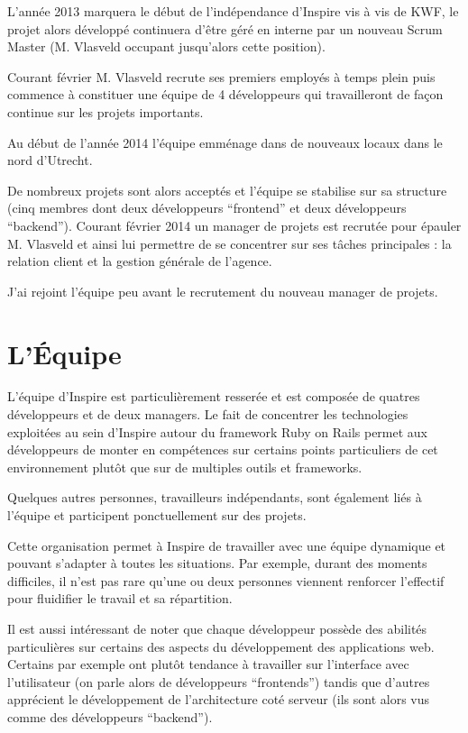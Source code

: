 \documentclass[12pt,a4paper]{book}
\begin{document}
L'année 2013 marquera le début de l'indépendance d'Inspire vis à vis de KWF, le projet alors développé continuera d'être géré en interne par un nouveau Scrum Master (M. Vlasveld occupant jusqu'alors cette position).

Courant février M. Vlasveld recrute ses premiers employés à temps plein puis commence à constituer une équipe de 4 développeurs qui travailleront de façon continue sur les projets importants.

Au début de l'année 2014 l'équipe emménage dans de nouveaux locaux dans le nord d'Utrecht.

De nombreux projets sont alors acceptés et l'équipe se stabilise sur sa structure (cinq membres dont deux développeurs ``frontend'' et deux développeurs ``backend''). Courant février 2014 un manager de projets est recrutée pour épauler M. Vlasveld et ainsi lui permettre de se concentrer sur ses tâches principales : la relation client et la gestion générale de l'agence.

J'ai rejoint l'équipe peu avant le recrutement du nouveau manager de projets.

\section{L'Équipe}

L'équipe d'Inspire est particulièrement resserée et est composée de quatres développeurs et de deux managers. Le fait de concentrer les technologies exploitées au sein d'Inspire autour du framework Ruby on Rails permet aux développeurs de monter en compétences sur certains points particuliers de cet environnement plutôt que sur de multiples outils et frameworks.

Quelques autres personnes, travailleurs indépendants, sont également liés à l'équipe et participent ponctuellement sur des projets.

Cette organisation permet à Inspire de travailler avec une équipe dynamique et pouvant s'adapter à toutes les situations. Par exemple, durant des moments difficiles, il n'est pas rare qu'une ou deux personnes viennent renforcer l'effectif pour fluidifier le travail et sa répartition. 

Il est aussi intéressant de noter que chaque développeur possède des abilités particulières sur certains des aspects du développement des applications web. Certains par exemple ont plutôt tendance à travailler sur l'interface avec l'utilisateur (on parle alors de développeurs ``frontends'') tandis que d'autres apprécient le développement de l'architecture coté serveur (ils sont alors vus comme des développeurs ``backend'').
\end{document}
